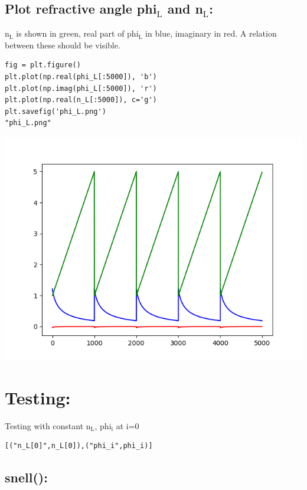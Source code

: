 \documentclass[11pt]{article}
\begin{document}
\subsection{Plot refractive angle phi\(_{\text{L}}\) and n\(_{\text{L}}\):}
\label{sec:org90ebbe5}

n\(_{\text{L}}\) is shown in green, real part of phi\(_{\text{L}}\) in blue, imaginary in red. 
A relation between these should be visible.

\begin{verbatim}
fig = plt.figure()
plt.plot(np.real(phi_L[:5000]), 'b')
plt.plot(np.imag(phi_L[:5000]), 'r')
plt.plot(np.real(n_L[:5000]), c='g')
plt.savefig('phi_L.png')
"phi_L.png"
\end{verbatim}

\begin{center}
\includegraphics[width=.9\linewidth]{phi_L.png}
\end{center}


\section{Testing:}
\label{sec:orga454f24}

Testing with constant n\(_{\text{L}}\), phi\(_{\text{i}}\) at i=0
\begin{verbatim}
[("n_L[0]",n_L[0]),("phi_i",phi_i)]
\end{verbatim}

\subsection{snell():}
\label{sec:orgff17aca}
\end{document}
